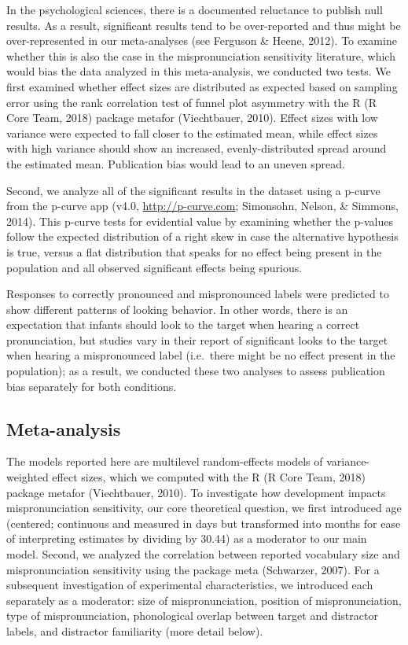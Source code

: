 \documentclass[
  english,
  man, noextraspace]{apa6}
\begin{document}
In the psychological sciences, there is a documented reluctance to publish null results. As a result, significant results tend to be over-reported and thus might be over-represented in our meta-analyses (see Ferguson \& Heene, 2012). To examine whether this is also the case in the mispronunciation sensitivity literature, which would bias the data analyzed in this meta-analysis, we conducted two tests. We first examined whether effect sizes are distributed as expected based on sampling error using the rank correlation test of funnel plot asymmetry with the R (R Core Team, 2018) package metafor (Viechtbauer, 2010). Effect sizes with low variance were expected to fall closer to the estimated mean, while effect sizes with high variance should show an increased, evenly-distributed spread around the estimated mean. Publication bias would lead to an uneven spread.

Second, we analyze all of the significant results in the dataset using a p-curve from the p-curve app (v4.0, \url{http://p-curve.com}; Simonsohn, Nelson, \& Simmons, 2014). This p-curve tests for evidential value by examining whether the p-values follow the expected distribution of a right skew in case the alternative hypothesis is true, versus a flat distribution that speaks for no effect being present in the population and all observed significant effects being spurious.

Responses to correctly pronounced and mispronounced labels were predicted to show different patterns of looking behavior. In other words, there is an expectation that infants should look to the target when hearing a correct pronunciation, but studies vary in their report of significant looks to the target when hearing a mispronounced label (i.e.~there might be no effect present in the population); as a result, we conducted these two analyses to assess publication bias separately for both conditions.

\hypertarget{meta-analysis}{%
\subsection{Meta-analysis}\label{meta-analysis}}

The models reported here are multilevel random-effects models of variance-weighted effect sizes, which we computed with the R (R Core Team, 2018) package metafor (Viechtbauer, 2010). To investigate how development impacts mispronunciation sensitivity, our core theoretical question, we first introduced age (centered; continuous and measured in days but transformed into months for ease of interpreting estimates by dividing by 30.44) as a moderator to our main model. Second, we analyzed the correlation between reported vocabulary size and mispronunciation sensitivity using the package meta (Schwarzer, 2007). For a subsequent investigation of experimental characteristics, we introduced each separately as a moderator: size of mispronunciation, position of mispronunciation, type of mispronunciation, phonological overlap between target and distractor labels, and distractor familiarity (more detail below).
\end{document}
